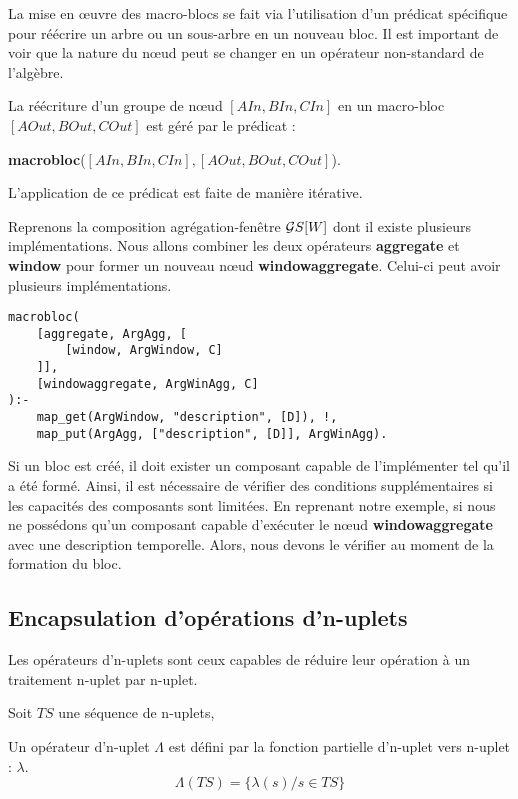 La mise en œuvre des macro-blocs se fait via l'utilisation d'un prédicat spécifique pour réécrire un arbre ou un sous-arbre en un nouveau bloc. Il est important de voir que la nature du nœud peut se changer en un opérateur non-standard de l'algèbre.
\begin{regle}
La réécriture d'un groupe de nœud $[AIn,BIn,CIn]$ en un macro-bloc $[AOut,BOut,COut]$ est géré par le prédicat :
\begin{center} \textbf{macrobloc}($[AIn,BIn,CIn],[AOut,BOut,COut]$).\end{center}
L'application de ce prédicat est faite de manière itérative.
\end{regle}
\begin{example}
    Reprenons la composition agrégation-fenêtre $\mathcal{G} S[W]$ dont il existe plusieurs implémentations. Nous allons combiner les deux opérateurs \textbf{aggregate} et \textbf{window} pour former un nouveau nœud \textbf{windowaggregate}. Celui-ci peut avoir plusieurs implémentations.
    \begin{lstlisting}
macrobloc(
    [aggregate, ArgAgg, [
        [window, ArgWindow, C]
    ]], 
    [windowaggregate, ArgWinAgg, C]
):-
    map_get(ArgWindow, "description", [D]), !,
    map_put(ArgAgg, ["description", [D]], ArgWinAgg). 
    \end{lstlisting}
\end{example}
Si un bloc est créé, il doit exister un composant capable de l'implémenter tel qu'il a été formé. Ainsi, il est nécessaire de vérifier des conditions supplémentaires si les capacités des composants sont limitées. En reprenant notre exemple, si nous ne possédons qu'un composant capable d'exécuter le nœud \textbf{windowaggregate} avec une description temporelle. Alors, nous devons le vérifier au moment de la formation du bloc.

\subsection{Encapsulation d'opérations d'n-uplets}
Les opérateurs d'n-uplets sont ceux capables de réduire leur opération à un traitement n-uplet par n-uplet.
\begin{defi}\label{def:operateurtuple}
    Soit $TS$ une séquence de n-uplets,

    Un opérateur d'n-uplet $\Lambda$ est défini par la fonction partielle d'n-uplet vers n-uplet : $\lambda$.
    $$\Lambda(TS) = \{\lambda(s) / s \in TS \}$$
\end{defi}

